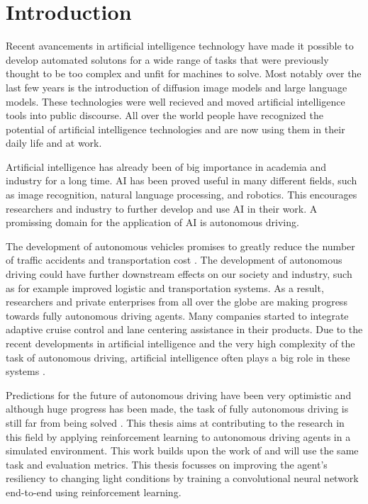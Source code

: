 \chapter{Introduction}
\label{cha:Introduction}


Recent avancements in artificial intelligence technology have made it possible to develop automated solutons for a wide range of tasks that were previously thought to be too complex and unfit for machines to solve. Most notably over the last few years is the introduction of diffusion image models and large language models. These technologies were well recieved and moved artificial intelligence tools into public discourse. All over the world people have recognized the potential of artificial intelligence technologies and are now using them in their daily life and at work.

Artificial intelligence has already been of big importance in academia and industry for a long time. AI has been proved useful in many different fields, such as image recognition, natural language processing, and robotics. This encourages researchers and industry to further develop and use AI in their work. A promissing domain for the application of AI is autonomous driving.

The development of autonomous vehicles promises to greatly reduce the number of traffic accidents and transportation cost \textcite{mckinsey}. The development of autonomous driving could have further downstream effects on our society and industry, such as for example improved logistic and transportation systems.
As a result, researchers and private enterprises from all over the globe are making progress towards fully autonomous driving agents. Many companies started to integrate adaptive cruise control and lane centering assistance \textcite{carreviews} in their products. Due to the recent developments in artificial intelligence and the very high complexity of the task of autonomous driving, artificial intelligence often plays a big role in these systems \textcite{drl_for_ad}.

Predictions for the future of autonomous driving have been very optimistic and although huge progress has been made, the task of fully autonomous driving is still far from being solved \textcite{state_of_autonomous_driving2023}. This thesis aims at contributing to the research in this field by applying reinforcement learning to autonomous driving agents in a simulated environment. This work builds upon the work of \textcite{maximilian} and will use the same task and evaluation metrics. This thesis focusses on improving the agent's resiliency to changing light conditions by training a convolutional neural network end-to-end using reinforcement learning.
